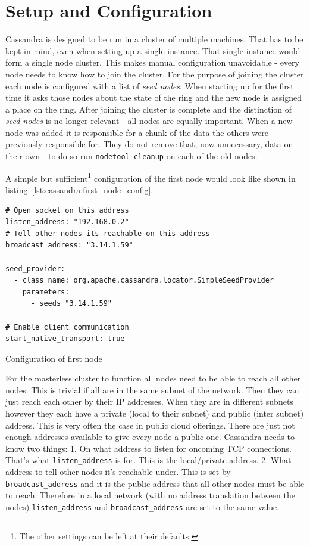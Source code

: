 \section{Setup and Configuration}  %
Cassandra is designed to be run in a cluster of multiple machines. That has to be kept in mind, even when setting up a single instance. That single instance would form a single node cluster. This makes manual configuration unavoidable - every node needs to know how to join the cluster.
For the purpose of joining the cluster each node is configured with a list of \textit{seed nodes}. When starting up for the first time it asks those nodes about the state of the ring and the new node is assigned a place on the ring. After joining the cluster is complete and the distinction of \textit{seed nodes} is no longer relevant - all nodes are equally important.
When a new node was added it is responsible for a chunk of the data the others were previously responsible for. They do not remove that, now unnecessary, data on their own - to do so run \texttt{nodetool cleanup} on each of the old nodes.

A simple but sufficient\footnote{The other settings can be left at their defaults.} configuration of the first node would look like shown in listing~\ref{lst:cassandra:first_node_config}. \autocite{cassandra_config}

\begin{listing}[ht]
  \begin{verbatim}
# Open socket on this address
listen_address: "192.168.0.2"
# Tell other nodes its reachable on this address
broadcast_address: "3.14.1.59"

seed_provider:
  - class_name: org.apache.cassandra.locator.SimpleSeedProvider
    parameters:
      - seeds "3.14.1.59"

# Enable client communication
start_native_transport: true
  \end{verbatim}
  \caption{Configuration of first node}
  \label{lst:cassandra:first_node_config}
\end{listing}

For the masterless cluster to function all nodes need to be able to reach all other nodes. This is trivial if all are in the same subnet of the network. Then they can just reach each other by their IP addresses.
When they are in different subnets however they each have a private (local to their subnet) and public (inter subnet) address. This is very often the case in public cloud offerings. There are just not enough addresses available to give every node a public one.
Cassandra needs to know two things:
1. On what address to listen for oncoming TCP connections. That's what \texttt{listen\_address} is for. This is the local/private address.
2. What address to tell other nodes it's reachable under. This is set by \texttt{broadcast\_address} and it is the public address that all other nodes must be able to reach.
Therefore in a local network (with no address translation between the nodes) \texttt{listen\_address} and \texttt{broadcast\_address} are set to the same value.


